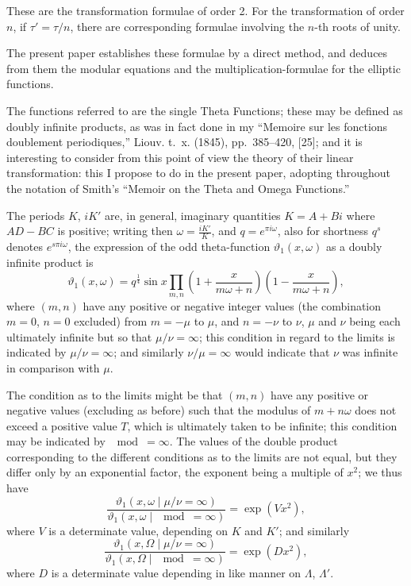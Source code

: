 \documentclass[11pt,a4paper]{book}
\begin{document}
These are the transformation formulae of order 2. For the transformation of order $n$, if $\tau' = \tau/n$, there are corresponding formulae involving the $n$-th roots of unity.

The present paper establishes these formulae by a direct method, and deduces from them the modular equations and the multiplication-formulae for the elliptic functions.

The functions referred to are the single Theta Functions; these may be defined as doubly infinite products, as was in fact done in my ``Memoire sur les fonctions doublement periodiques,'' Liouv. t.~x. (1845), pp.~385--420, [25]; and it is interesting to consider from this point of view the theory of their linear transformation: this I propose to do in the present paper, adopting throughout the notation of Smith's ``Memoir on the Theta and Omega Functions.''

The periods $K$, $iK'$ are, in general, imaginary quantities $K = A + Bi$ where $AD - BC$ is positive; writing then $\omega = \frac{iK'}{K}$, and $q = e^{\pi i \omega}$, also for shortness $q^s$ denotes $e^{s \pi i \omega}$, the expression of the odd theta-function $\vartheta_1(x, \omega)$ as a doubly infinite product is
\[
\vartheta_1(x, \omega) = q^{\frac{1}{4}} \sin x \prod_{m,n} \left(1 + \frac{x}{m\omega + n}\right) \left(1 - \frac{x}{m\omega + n}\right),
\]
where $(m, n)$ have any positive or negative integer values (the combination $m = 0$, $n = 0$ excluded) from $m = -\mu$ to $\mu$, and $n = -\nu$ to $\nu$, $\mu$ and $\nu$ being each ultimately infinite but so that $\mu/\nu = \infty$; this condition in regard to the limits is indicated by $\mu/\nu = \infty$; and similarly $\nu/\mu = \infty$ would indicate that $\nu$ was infinite in comparison with $\mu$.

The condition as to the limits might be that $(m, n)$ have any positive or negative values (excluding as before) such that the modulus of $m + n\omega$ does not exceed a positive value $T$, which is ultimately taken to be infinite; this condition may be indicated by $\mod = \infty$. The values of the double product corresponding to the different conditions as to the limits are not equal, but they differ only by an exponential factor, the exponent being a multiple of $x^2$; we thus have
\[
\frac{\vartheta_1(x, \omega \mid \mu/\nu = \infty)}{\vartheta_1(x, \omega \mid \mod = \infty)} = \exp(Vx^2),
\]
where $V$ is a determinate value, depending on $K$ and $K'$; and similarly
\[
\frac{\vartheta_1(x, \Omega \mid \mu/\nu = \infty)}{\vartheta_1(x, \Omega \mid \mod = \infty)} = \exp(Dx^2),
\]
where $D$ is a determinate value depending in like manner on $\Lambda$, $\Lambda'$.
\end{document}

